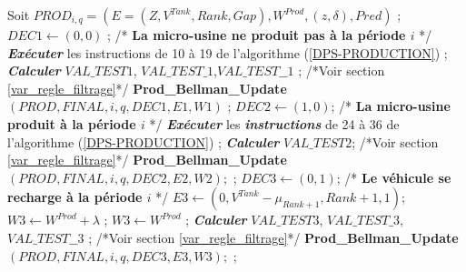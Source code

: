 \begin{algorithm}
\begin{algorithmic}[1]
		\BOUCLEPRINCIPAL
		\vspace{0.2cm}
		\STATE Soit $PROD_{i, q} = (E =  (Z, V^{Tank}, Rank, Gap),  W^{Prod}, (z, \delta), Pred)$ ;
		\STATE $DEC1 \leftarrow (0, 0)$ ; /* \textbf{La micro-usine ne produit pas à la période $i$} */
		\STATE \textit{\textbf{Exécuter}}  les instructions de 10 à 19 de l'algorithme (\ref{DPS-PRODUCTION}) ;
		\STATE \textit{\textbf{Calculer}} $VAL\_TEST1$, $VAL\_TEST\_1$,$VAL\_TEST\_\_1$ ; /*Voir section \ref{var_regle_filtrage}*/
		\STATE \textbf{Prod\_Bellman\_Update}$(PROD, FINAL, i, q, DEC1, E1, W1)$ ;
		\ENDIF
		\STATE $DEC2 \leftarrow (1, 0)$; /* \textbf{La micro-usine produit à la période $i$} */
		\STATE \textit{\textbf{Exécuter}} les \textit{\textbf{instructions}} de 24 à 36 de l'algorithme (\ref{DPS-PRODUCTION}) ;
		\STATE \textit{\textbf{Calculer}} $VAL\_TEST2$; /*Voir section \ref{var_regle_filtrage}*/
		\STATE \textbf{Prod\_Bellman\_Update}$(PROD, FINAL, i, q, DEC2, E2, W2);$ ;
		\ENDIF
		\STATE $DEC3 \leftarrow (0, 1)$; /* \textbf{Le véhicule se recharge à la période $i$} */
		\STATE $E3 \leftarrow (0, V^{Tank}-\mu_{Rank+1}, Rank+1, 1)$; 
		\STATE $W3 \leftarrow W^{Prod}  + \lambda$ ;
		\ELSE
		\STATE $W3 \leftarrow W^{Prod}$ ;  
		\ENDIF
		\STATE \textit{\textbf{Calculer}} $VAL\_TEST3$, $VAL\_TEST\_3$,$VAL\_TEST\_\_3$ ; /*Voir section \ref{var_regle_filtrage}*/
		\STATE \textbf{Prod\_Bellman\_Update}$(PROD, FINAL, i, q, DEC3, E3, W3);$ ;
		\ENDIF
		\ENDFOR
		\ENDFOR
	\end{algorithmic}
\end{algorithm}

